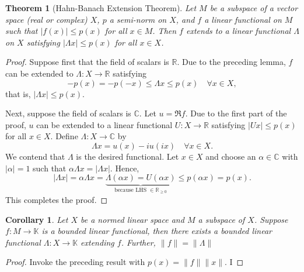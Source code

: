 \documentclass[12pt]{article}
\theoremstyle{thmstyle}
\newtheorem{theorem}{Theorem}[section]
\theoremstyle{defstyle}
\newtheorem*{corollary}{Corollary}
\newcommand{\R}{\mathbb{R}}
\newcommand{\bbC}{\mathbb{C}}
\newcommand{\K}{\mathbb{K}} %
\renewcommand{\le}{\leqslant}
\renewcommand{\ge}{\geqslant}
\begin{document}
\begin{theorem}[Hahn-Banach Extension Theorem]
    Let $M$ be a subspace of a vector space (real or complex) $X$, $p$ a semi-norm on $X$, and $f$ a linear functional on $M$ such that $|f(x)|\le p(x)$ for all $x\in M$. Then $f$ extends to a linear functional $\Lambda$ on $X$ satisfying $|\Lambda x|\le p(x)$ for all $x\in X$.
\end{theorem}
\begin{proof}
    Suppose first that the field of scalars is $\R$. Due to the preceding lemma, $f$ can be extended to $\Lambda: X\to\R$ satisfying 
    \begin{equation*}
        -p(x) = -p(-x)\le\Lambda x\le p(x)\quad\forall x\in X,
    \end{equation*}
    that is, $|\Lambda x|\le p(x)$.

    Next, suppose the field of scalars is $\bbC$. Let $u = \Re f$. Due to the first part of the proof, $u$ can be extended to a linear functional $U: X\to\R$ satisfying $|Ux|\le p(x)$ for all $x\in X$. Define $\Lambda: X\to\bbC$ by 
    \begin{equation*}
        \Lambda x = u(x) - iu(ix)\quad\forall x\in X.
    \end{equation*}
    We contend that $\Lambda$ is the desired functional. Let $x\in X$ and choose an $\alpha\in\bbC$ with $|\alpha| = 1$ such that $\alpha\Lambda x = |\Lambda x|$. Hence, 
    \begin{equation*}
        |\Lambda x| = \alpha\Lambda x = \underbrace{\Lambda(\alpha x) = U(\alpha x)}_{\text{because LHS }\in\R_{\ge 0}}\le p(\alpha x) = p(x).
    \end{equation*}
    This completes the proof.
\end{proof}

\begin{corollary}
    Let $X$ be a normed linear space and $M$ a subspace of $X$. Suppose $f: M\to\K$ is a bounded linear functional, then there exists a bounded linear functional $\Lambda: X\to \K$ extending $f$. Further, $\|f\| = \|\Lambda\|$
\end{corollary}
\begin{proof}
    Invoke the preceding result with $p(x) = \|f\|\|x\|$. I
\end{proof}
\end{document}
